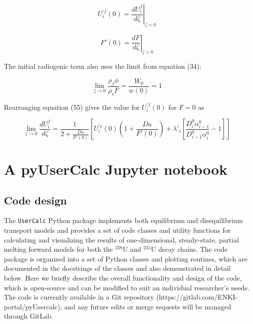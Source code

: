\documentclass[draft]{agujournal2019}
\begin{document}
\begin{linenomath*}
\begin{equation}
    U_i^{'f}(0) = \left.\frac{dU_i^f}{d\zeta}\right|_{\zeta=0}\label{eq:57}
\end{equation}
\end{linenomath*}

\begin{linenomath*}
\begin{equation}
    F'(0) = \left.\frac{dF}{d\zeta}\right|_{\zeta=0}\label{eq:58}
\end{equation}
\end{linenomath*}

The initial radiogenic term also uses the limit from equation (34):

\begin{linenomath*}
\begin{equation}
    \lim_{\zeta \rightarrow 0}  \frac{\rho_f \phi}{\rho_s F} = \frac{W_0}{w(0)} = 1\label{eq:59}
\end{equation}
\end{linenomath*}

Rearranging equation (55) gives the value for $U_i^{'f}(0)$ for $F=0$ as

\begin{linenomath*}
\begin{equation}
    \lim_{\zeta \rightarrow 0} \frac{dU_i^f}{d\zeta} = \frac{1}{2 + \frac{Da}{F'(0)}}\left[U_i^{'s}(0)\left(1 + \frac{Da}{F'(0)}\right) +\lambda'_i \left[\frac{D_i^0 \alpha_{i-1}^0}{D_{i-1}^0 \alpha_i^0} - 1\right] \right]\label{eq:60}
\end{equation}
\end{linenomath*}


\section{A pyUserCalc Jupyter notebook}

\subsection{Code design}

The \colorbox{gray!20}{\texttt{UserCalc}} Python package implements both equilibrium and disequilibrium transport models and provides a set of code classes and utility functions for calculating and visualizing the results of one-dimensional, steady-state, partial melting forward models for both the $^{238}$U and $^{235}$U decay chains. The code package is organized into a set of Python classes and plotting routines, which are documented in the docstrings of the classes and also demonstrated in detail below. Here we briefly describe the overall functionality and design of the code, which is open-source and can be modified to suit an individual researcher's needs. The code is currently available in a Git repository (https://gitlab.com/ENKI-portal/pyUsercalc), and any future edits or merge requests will be managed through GitLab.
\end{document}
